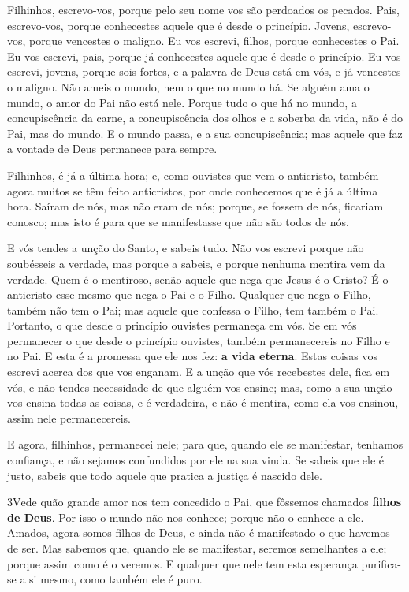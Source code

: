Filhinhos, escrevo-vos, porque pelo seu nome vos são perdoados os
pecados. Pais, escrevo-vos, porque conhecestes aquele que é
desde o princípio. Jovens, escrevo-vos, porque vencestes o maligno.
Eu vos escrevi, filhos, porque conhecestes o Pai. Eu vos
escrevi, pais, porque já conhecestes aquele que é desde o princípio.
Eu vos escrevi, jovens, porque sois fortes, e a palavra de Deus está
em vós, e já vencestes o maligno. Não ameis o mundo, nem o
que no mundo há. Se alguém ama o mundo, o amor do Pai não está nele.
Porque tudo o que há no mundo, a concupiscência da carne, a
concupiscência dos olhos e a soberba da vida, não é do Pai, mas do
mundo. E o mundo passa, e a sua concupiscência; mas aquele
que faz a vontade de Deus permanece para sempre.

Filhinhos, é já a última hora; e, como ouvistes que vem o
anticristo, também agora muitos se têm feito anticristos, por onde
conhecemos que é já a última hora. Saíram de nós, mas não
eram de nós; porque, se fossem de nós, ficariam conosco; mas isto é
para que se manifestasse que não são todos de nós.

E vós tendes a unção do Santo, e sabeis tudo. Não vos
escrevi porque não soubésseis a verdade, mas porque a sabeis, e
porque nenhuma mentira vem da verdade. Quem é o mentiroso,
senão aquele que nega que Jesus é o Cristo? É o anticristo esse
mesmo que nega o Pai e o Filho. Qualquer que nega o Filho,
também não tem o Pai; mas aquele que confessa o Filho, tem também o
Pai. Portanto, o que desde o princípio ouvistes permaneça em
vós. Se em vós permanecer o que desde o princípio ouvistes, também
permanecereis no Filho e no Pai. E esta é a promessa que ele
nos fez: \textbf{a vida eterna}. Estas coisas vos escrevi
acerca dos que vos enganam. E a unção que vós recebestes
dele, fica em vós, e não tendes necessidade de que alguém vos
ensine; mas, como a sua unção vos ensina todas as coisas, e é
verdadeira, e não é mentira, como ela vos ensinou, assim nele
permanecereis.

E agora, filhinhos, permanecei nele; para que, quando ele se
manifestar, tenhamos confiança, e não sejamos confundidos por ele na
sua vinda. Se sabeis que ele é justo, sabeis que todo aquele
que pratica a justiça é nascido dele.

\medskip

\lettrine{3} Vede quão grande amor nos tem concedido o Pai,
que fôssemos chamados \textbf{filhos de Deus}. Por isso o mundo não
nos conhece; porque não o conhece a ele. Amados, agora somos
filhos de Deus, e ainda não é manifestado o que havemos de ser. Mas
sabemos que, quando ele se manifestar, seremos semelhantes a ele;
porque assim como é o veremos. E qualquer que nele tem esta
esperança purifica-se a si mesmo, como também ele é puro.

